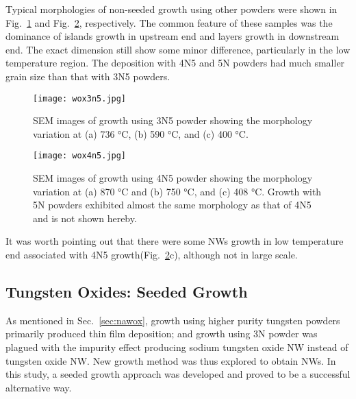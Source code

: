 Typical morphologies of non-seeded growth using other powders were shown in Fig.~\ref{fig:wox3n5} and Fig.~\ref{fig:wox4n5}, respectively. The common feature of these samples was the dominance of islands growth in upstream end and layers growth in downstream end. The exact dimension still show some minor difference, particularly in the low temperature region. The deposition with 4N5 and 5N powders had much smaller grain size than that with 3N5 powders.
\begin{figure}[htb]
\centering
\texttt{[image: wox3n5.jpg]}
\caption[SEM images of  growth using 3N5 powder]{SEM images of  growth using 3N5 powder showing the morphology variation at (a) 736 \si{\degreeCelsius}, (b) 590 \si{\degreeCelsius}, and (c) 400 \si{\degreeCelsius}.}
\label{fig:wox3n5}
\end{figure}

\begin{figure}[htb]
\centering
\texttt{[image: wox4n5.jpg]}
\caption[SEM images of  growth using 4N5 powder]{SEM images of  growth using 4N5 powder showing the morphology variation at (a) 870 \si{\degreeCelsius} and (b) 750 \si{\degreeCelsius}, and (c) 408 \si{\degreeCelsius}. Growth with 5N powders exhibited almost the same morphology as that of 4N5 and is not shown hereby.}
\label{fig:wox4n5}
\end{figure}
It was worth pointing out that there were some NWs growth in low temperature end associated with 4N5 growth(Fig.~\ref{fig:wox4n5}c), although not in large scale.

\subsection{Tungsten Oxides: Seeded Growth}\label{sec:sgfg}

As mentioned in Sec.~\ref{sec:nawox}, growth using higher purity tungsten powders primarily produced thin film deposition; and growth using 3N powder was plagued with the impurity effect producing sodium tungsten oxide NW instead of tungsten oxide NW. New growth method was thus explored to obtain  NWs. In this study, a seeded growth approach was developed and proved to be a successful alternative way. 

